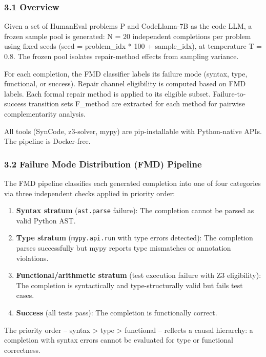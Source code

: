 
\subsubsection{3.1 Overview}

Given a set of HumanEval problems P and CodeLlama-7B as the code LLM, a frozen sample pool is generated: N = 20 independent completions per problem using fixed seeds (seed = problem_idx * 100 + sample_idx), at temperature T = 0.8. The frozen pool isolates repair-method effects from sampling variance.

For each completion, the FMD classifier labels its failure mode (syntax, type, functional, or success). Repair channel eligibility is computed based on FMD labels. Each formal repair method is applied to its eligible subset. Failure-to-success transition sets F_method are extracted for each method for pairwise complementarity analysis.

All tools (SynCode, z3-solver, mypy) are pip-installable with Python-native APIs. The pipeline is Docker-free.

\subsubsection{3.2 Failure Mode Distribution (FMD) Pipeline}

The FMD pipeline classifies each generated completion into one of four categories via three independent checks applied in priority order:

\begin{enumerate}
\item \textbf{Syntax stratum} (\texttt{ast.parse} failure): The completion cannot be parsed as valid Python AST.
\item \textbf{Type stratum} (\texttt{mypy.api.run} with type errors detected): The completion parses successfully but mypy reports type mismatches or annotation violations.
\item \textbf{Functional/arithmetic stratum} (test execution failure with Z3 eligibility): The completion is syntactically and type-structurally valid but fails test cases.
\item \textbf{Success} (all tests pass): The completion is functionally correct.
\end{enumerate}

The priority order -- syntax > type > functional -- reflects a causal hierarchy: a completion with syntax errors cannot be evaluated for type or functional correctness.

